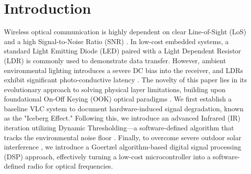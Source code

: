 \documentclass[conference]{IEEEtran}
\begin{document}
\section{Introduction}
Wireless optical communication is highly dependent on clear Line-of-Sight (LoS) and a high Signal-to-Noise Ratio (SNR) \cite{elgala2011, ghassemlooy2012}. In low-cost embedded systems, a standard Light Emitting Diode (LED) paired with a Light Dependent Resistor (LDR) is commonly used to demonstrate data transfer. However, ambient environmental lighting introduces a severe DC bias into the receiver, and LDRs exhibit significant photo-conductive latency \cite{sewaiwar2015}. 
The novelty of this paper lies in its evolutionary approach to solving physical layer limitations, building upon foundational On-Off Keying (OOK) optical paradigms \cite{komine2004}. We first establish a baseline VLC system to document hardware-induced signal degradation, known as the "Iceberg Effect." Following this, we introduce an advanced Infrared (IR) iteration utilizing Dynamic Thresholding—a software-defined algorithm that tracks the environmental noise floor \cite{green2005}. Finally, to overcome severe outdoor solar interference \cite{rajagopal2012}, we introduce a Goertzel algorithm-based digital signal processing (DSP) approach, effectively turning a low-cost microcontroller into a software-defined radio for optical frequencies.
\end{document}
